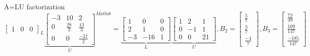 \documentclass[aspectratio=169]{beamer}
\begin{document}
\begin{frame}[t]{A=LU factorization}
{{\begin{equation*}
{{\begin{bmatrix}
                            1            & 0             & 0
                        \end{bmatrix}}_{L}\underbrace{\begin{bmatrix}
                            -3 & 10           & 2             \\
                            0  & \frac{29}{3} & \frac{13}{3}  \\
                            0  & 0            & \frac{-21}{2}
                        \end{bmatrix}}_{U}}^{Matlab}=\underbrace{\begin{bmatrix}
                        1  & 0   & 0 \\
                        2  & 1   & 0 \\
                        -3 & -16 & 1
                    \end{bmatrix}}_{L}\underbrace{\begin{bmatrix}
                        1 & 2  & 1  \\
                        0 & -1 & 1  \\
                        0 & 0  & 21
                    \end{bmatrix}}_{U},B_2=\begin{bmatrix}
                    \frac{5}{7} \\ \frac{3}{7} \\ \frac{-4}{7}
                \end{bmatrix},B_3=\begin{bmatrix}
                    \frac{73}{49} \\ \frac{109}{147} \\
                    \frac{-185}{147}
                \end{bmatrix}
            \end{equation*}}}
\end{frame}
\end{document}
